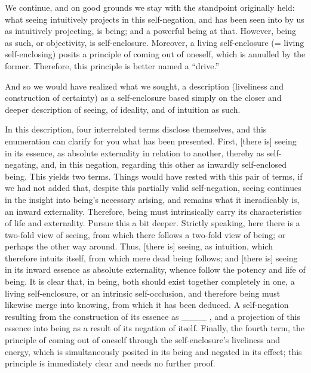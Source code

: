 We continue, and on good grounds
we stay with the standpoint originally held:
what seeing intuitively projects in this self-negation,
and has been seen into by us as intuitively projecting,
is being; and a powerful being at that.
However, being as such, or objectivity, is self-enclosure.
Moreover, a living self-enclosure (= living self-enclosing)
posits a principle of coming out of oneself,
which is annulled by the former.
Therefore, this principle is better named a “drive.”

And so we would have realized what we sought,
a description (liveliness and construction of certainty)
as a self-enclosure based simply on
the closer and deeper description of seeing,
of ideality, and of intuition as such.

In this description, four interrelated terms disclose themselves,
and this enumeration can clarify for you what has been presented.
First, [there is] seeing in its essence,
as absolute externality in relation to another,
thereby as self-negating, and, in this negation,
regarding this other as inwardly self-enclosed being.
This yields two terms.
Things would have rested with this pair of terms,
if we had not added that,
despite this partially valid self-negation,
seeing continues in the insight
into being's necessary arising,
and remains what it ineradicably is,
an inward externality.
Therefore, being must intrinsically carry
its characteristics of life and externality.
Pursue this a bit deeper.
Strictly speaking, here there is
a two-fold view of seeing,
from which there follows
a two-fold view of being;
or perhaps the other way around.
Thus, [there is] seeing, as intuition,
which therefore intuits itself,
from which mere dead being follows;
and [there is] seeing in its inward essence
as absolute externality,
whence follow the potency and life of being.
It is clear that, in being,
both should exist together completely in one,
a living self-enclosure,
or an intrinsic self-occlusion,
and therefore being must likewise
merge into knowing,
from which it has been deduced.
A self-negation resulting from
the construction of its essence as ____ ,
and a projection of this essence into being
as a result of its negation of itself.
Finally, the fourth term,
the principle of coming out of oneself
through the self-enclosure's liveliness and energy,
which is simultaneously
posited in its being
and negated in its effect;
this principle is immediately clear
and needs no further proof.

